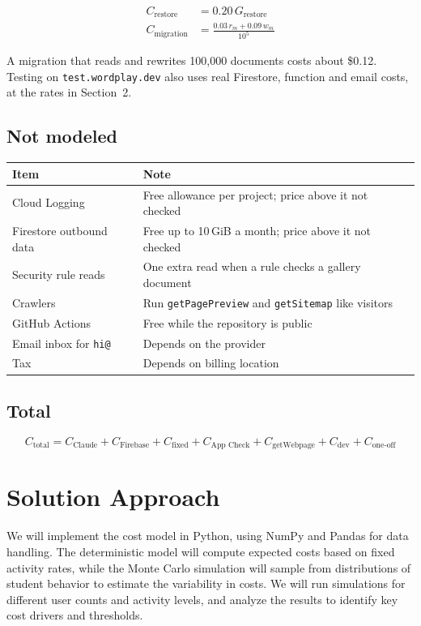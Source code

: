 \documentclass{article}
\begin{document}
\begin{align*}
C_{\text{restore}} &= 0.20\,G_{\text{restore}} \\
C_{\text{migration}} &= \frac{0.03\,r_m + 0.09\,w_m}{10^{5}}
\end{align*}

A migration that reads and rewrites 100{,}000 documents costs about \$0.12.
Testing on \texttt{test.wordplay.dev} also uses real Firestore, function and
email costs, at the rates in Section~2.

\subsection{Not modeled}

\begin{center}
\begin{tabular}{ll}
\toprule
Item & Note \\
\midrule
Cloud Logging & Free allowance per project; price above it not checked \\
Firestore outbound data & Free up to 10\,GiB a month; price above it not checked \\
Security rule reads & One extra read when a rule checks a gallery document \\
Crawlers & Run \texttt{getPagePreview} and \texttt{getSitemap} like visitors \\
GitHub Actions & Free while the repository is public \\
Email inbox for \texttt{hi@} & Depends on the provider \\
Tax & Depends on billing location \\
\bottomrule
\end{tabular}
\end{center}

\subsection{Total}

\[
C_{\text{total}} =
C_{\text{Claude}} + C_{\text{Firebase}} + C_{\text{fixed}}
+ C_{\text{App Check}} + C_{\text{getWebpage}} + C_{\text{dev}}
+ C_{\text{one-off}}
\]

\section{Solution Approach}
We will implement the cost model in Python, using NumPy and Pandas for data handling.
The deterministic model will compute expected costs based on fixed activity rates, while 
the Monte Carlo simulation will sample from distributions of student behavior to estimate the variability in costs.
We will run simulations for different user counts and activity levels, and analyze the results to identify key cost drivers and thresholds.
\end{document}
